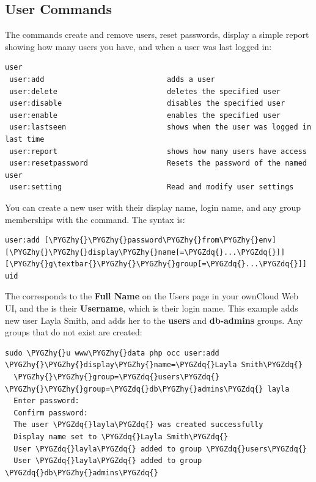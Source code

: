 \documentclass[letterpaper,10pt,english]{sphinxmanual}
\def\PYGZhy{\char`\-}
\def\PYGZdq{\char`\"}
\begin{document}
\subsection{User Commands}
\label{configuration_server/occ_command:user-commands}\label{configuration_server/occ_command:user-commands-label}
The  commands create and remove users, reset passwords, display a simple
report showing how many users you have, and when a user was last logged in:

\begin{Verbatim}[commandchars=\\\{\}]
user
 user:add                            adds a user
 user:delete                         deletes the specified user
 user:disable                        disables the specified user
 user:enable                         enables the specified user
 user:lastseen                       shows when the user was logged in last time
 user:report                         shows how many users have access
 user:resetpassword                  Resets the password of the named user
 user:setting                        Read and modify user settings
\end{Verbatim}

You can create a new user with their display name, login name, and any group
memberships with the  command. The syntax is:

\begin{Verbatim}[commandchars=\\\{\}]
user:add [\PYGZhy{}\PYGZhy{}password\PYGZhy{}from\PYGZhy{}env] [\PYGZhy{}\PYGZhy{}display\PYGZhy{}name[=\PYGZdq{}...\PYGZdq{}]] [\PYGZhy{}g\textbar{}\PYGZhy{}\PYGZhy{}group[=\PYGZdq{}...\PYGZdq{}]]
uid
\end{Verbatim}

The  corresponds to the \textbf{Full Name} on the Users page in your
ownCloud Web UI, and the  is their \textbf{Username}, which is their
login name. This example adds new user Layla Smith, and adds her to the
\textbf{users} and \textbf{db-admins} groups. Any groups that do not exist are created:

\begin{Verbatim}[commandchars=\\\{\}]
sudo \PYGZhy{}u www\PYGZhy{}data php occ user:add \PYGZhy{}\PYGZhy{}display\PYGZhy{}name=\PYGZdq{}Layla Smith\PYGZdq{}
  \PYGZhy{}\PYGZhy{}group=\PYGZdq{}users\PYGZdq{} \PYGZhy{}\PYGZhy{}group=\PYGZdq{}db\PYGZhy{}admins\PYGZdq{} layla
  Enter password:
  Confirm password:
  The user \PYGZdq{}layla\PYGZdq{} was created successfully
  Display name set to \PYGZdq{}Layla Smith\PYGZdq{}
  User \PYGZdq{}layla\PYGZdq{} added to group \PYGZdq{}users\PYGZdq{}
  User \PYGZdq{}layla\PYGZdq{} added to group \PYGZdq{}db\PYGZhy{}admins\PYGZdq{}
\end{Verbatim}
\end{document}
